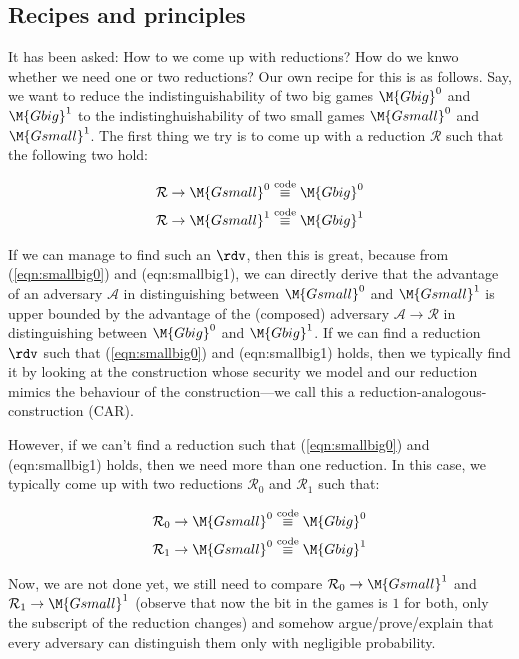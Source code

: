 
\subsection{Recipes and principles}
It has been asked: How to we come up with reductions? How do we knwo whether we need one or two reductions? Our own recipe for this is as follows. Say, we want to reduce the indistinguishability of two big games $\M{Gbig}^0$ and $\M{Gbig}^1$ to the indistinghuishability of two small games $\M{Gsmall}^0$ and $\M{Gsmall}^1$. The first thing we try is to come up with a reduction $\mathcal{R}$ such that the following two hold:

\begin{align}
    \label{eqn:smallbig0} & \mathcal{R}\rightarrow\M{Gsmall}^0\stackrel{\text{code}}{\equiv}\M{Gbig}^0 \\
    \label{eqn:smallbig1} & \mathcal{R}\rightarrow\M{Gsmall}^1\stackrel{\text{code}}{\equiv}\M{Gbig}^1
\end{align}

If we can manage to find such an $\rdv$, then this is great, because from (\ref{eqn:smallbig0}) and (eqn:smallbig1), we can directly derive that the advantage of an adversary $\mathcal{A}$ in distinguishing between $\M{Gsmall}^0$ and $\M{Gsmall}^1$ is upper bounded by the advantage of the (composed) adversary $\mathcal{A}\rightarrow\mathcal{R}$ in distinguishing between $\M{Gbig}^0$ and $\M{Gbig}^1$. If we can find a reduction $\rdv$ such that (\ref{eqn:smallbig0}) and (eqn:smallbig1) holds, then we typically find it by looking at the construction whose security we model and our reduction mimics the behaviour of the construction---we call this a reduction-analogous-construction (CAR).

However, if we can't find a reduction such that  (\ref{eqn:smallbig0}) and (eqn:smallbig1) holds, then we need more than one reduction. In this case, we typically come up with two reductions $\mathcal{R}_0$ and $\mathcal{R}_1$ such that:

\begin{align}
    \label{eqn:smallbig00} & \mathcal{R}_0\rightarrow\M{Gsmall}^0\stackrel{\text{code}}{\equiv}\M{Gbig}^0 \\
    \label{eqn:smallbig11} & \mathcal{R}_1\rightarrow\M{Gsmall}^0\stackrel{\text{code}}{\equiv}\M{Gbig}^1
\end{align}

Now, we are not done yet, we still need to compare $\mathcal{R}_0\rightarrow\M{Gsmall}^1$ and $\mathcal{R}_1\rightarrow\M{Gsmall}^1$ (observe that now the bit in the games is $1$ for both, only the subscript of the reduction changes) and somehow argue/prove/explain that every adversary can distinguish them only with negligible probability.